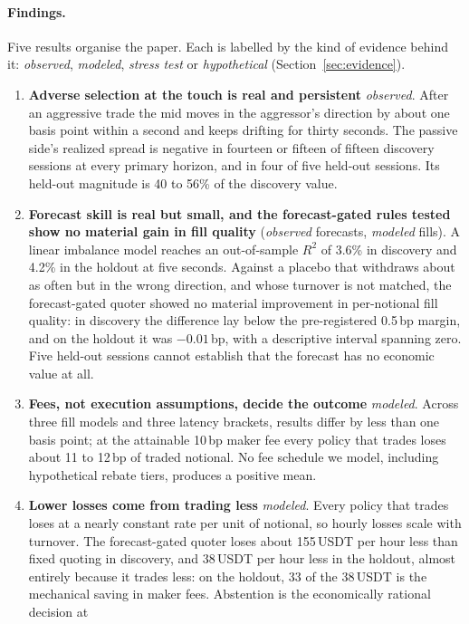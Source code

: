 \documentclass[11pt]{article}
\newcommand{\status}[1]{\textit{#1}}
\newcommand{\obs}{\status{observed}}
\newcommand{\mhr}{\status{modeled}}
\newcommand{\stress}{\status{stress test}}
\newcommand{\hyp}{\status{hypothetical}}
\newcommand{\bp}{\,bp}
\begin{document}
\paragraph{Findings.} Five results organise the paper. Each is labelled by the kind of evidence behind it: \obs,
\mhr, \stress{} or \hyp{} (Section~\ref{sec:evidence}).
\begin{enumerate}
  \item \textbf{Adverse selection at the touch is real and persistent} \obs{}. After an aggressive trade the mid moves
  in the aggressor's direction by about one basis point within a second and keeps drifting for thirty seconds. The
  passive side's realized spread is negative in fourteen or fifteen of fifteen discovery sessions at every primary
  horizon, and in four of five held-out sessions. Its held-out magnitude is 40 to 56\% of the discovery value.
  \item \textbf{Forecast skill is real but small, and the forecast-gated rules tested show no material gain in fill
  quality} (\obs{} forecasts, \mhr{} fills). A linear imbalance model reaches an out-of-sample $R^2$ of 3.6\% in discovery
  and 4.2\% in the holdout at five seconds. Against a placebo that withdraws about as often but in the wrong direction,
  and whose turnover is not matched, the forecast-gated quoter showed no material improvement in per-notional fill
  quality: in discovery the difference lay below the pre-registered 0.5\bp{} margin, and on the holdout it was $-0.01$\bp,
  with a descriptive interval spanning zero. Five held-out sessions cannot establish that the forecast has no economic
  value at all.
  \item \textbf{Fees, not execution assumptions, decide the outcome} \mhr{}. Across three fill models and three latency
  brackets, results differ by less than one basis point; at the attainable 10\bp{} maker fee every policy that trades
  loses about 11 to 12\bp{} of traded notional. No fee schedule we model, including hypothetical rebate tiers, produces a
  positive mean.
  \item \textbf{Lower losses come from trading less} \mhr{}. Every policy that trades loses at a nearly constant rate per
  unit of notional, so hourly losses scale with turnover. The forecast-gated quoter loses about 155\,USDT per hour less than fixed
  quoting in discovery, and 38\,USDT per hour less in the holdout, almost entirely because it trades less: on the
  holdout, 33 of the 38\,USDT is the mechanical saving in maker fees. Abstention is the economically rational decision at

\end{enumerate}
\end{document}
